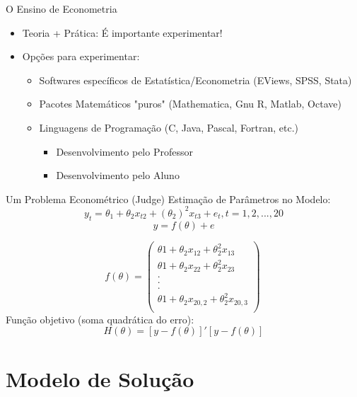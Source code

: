 \documentclass{beamer}
\begin{document}
\begin{frame}{O Ensino de Econometria}
	\begin{itemize}
		\item Teoria + Prática: É importante experimentar!
		\item Opções para experimentar:
		\begin {itemize}
			\item Softwares específicos de Estatística/Econometria (EViews, SPSS, Stata)
			\item Pacotes Matemáticos "puros" (Mathematica, Gnu R, Matlab, Octave)
			\item Linguagens de Programação (C, Java, Pascal, Fortran, etc.)
			\begin {itemize}
				\item Desenvolvimento pelo Professor
				\item Desenvolvimento pelo Aluno
			\end {itemize}
		\end {itemize}
	\end{itemize}
\end{frame}

\begin{frame}{Um Problema Econométrico}
(Judge) Estimação de Parâmetros no Modelo:
\[ y_t = \theta_1 + \theta_2 x_{t2} + (\theta_2)^2 x_{t3} +e_t , t = 1,2,...,20 \]
\[ y = f(\theta)+e\]

\[ f(\theta)=
        \left( \begin{array}{ccc}
\theta1 + \theta_2 x_{12} + \theta_2^2 x_{13} \\
\theta1 + \theta_2 x_{22} + \theta_2^2 x_{23} \\
.\\
.\\
.\\
\theta1 + \theta_2 x_{20,2} + \theta_2^2 x_{20,3} \\

\end{array} \right)\
 \]
Função objetivo (soma quadrática do erro): 
 \begin{equation}
  \label{eq_H}
  H(\theta) = [y - f(\theta)]'[y - f(\theta)] 
\end{equation}

\end{frame}

\section{Modelo de Solução}
\end{document}
